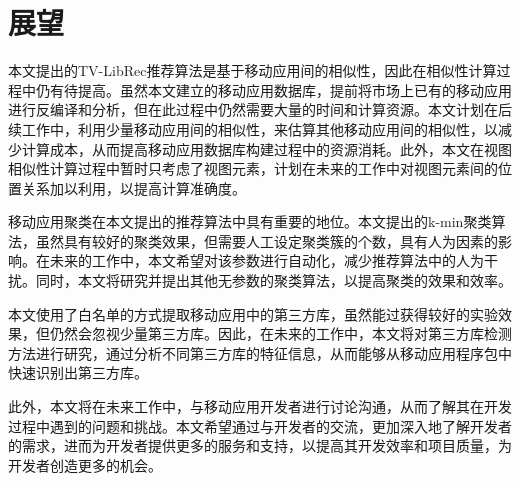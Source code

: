 \section{展望}
本文提出的TV-LibRec推荐算法是基于移动应用间的相似性，因此在相似性计算过程中仍有待提高。虽然本文建立的移动应用数据库，提前将市场上已有的移动应用进行反编译和分析，但在此过程中仍然需要大量的时间和计算资源。本文计划在后续工作中，利用少量移动应用间的相似性，来估算其他移动应用间的相似性，以减少计算成本，从而提高移动应用数据库构建过程中的资源消耗。此外，本文在视图相似性计算过程中暂时只考虑了视图元素，计划在未来的工作中对视图元素间的位置关系加以利用，以提高计算准确度。

移动应用聚类在本文提出的推荐算法中具有重要的地位。本文提出的k-min聚类算法，虽然具有较好的聚类效果，但需要人工设定聚类簇的个数，具有人为因素的影响。在未来的工作中，本文希望对该参数进行自动化，减少推荐算法中的人为干扰。同时，本文将研究并提出其他无参数的聚类算法，以提高聚类的效果和效率。

本文使用了白名单的方式提取移动应用中的第三方库，虽然能过获得较好的实验效果，但仍然会忽视少量第三方库。因此，在未来的工作中，本文将对第三方库检测方法进行研究，通过分析不同第三方库的特征信息，从而能够从移动应用程序包中快速识别出第三方库。

此外，本文将在未来工作中，与移动应用开发者进行讨论沟通，从而了解其在开发过程中遇到的问题和挑战。本文希望通过与开发者的交流，更加深入地了解开发者的需求，进而为开发者提供更多的服务和支持，以提高其开发效率和项目质量，为开发者创造更多的机会。